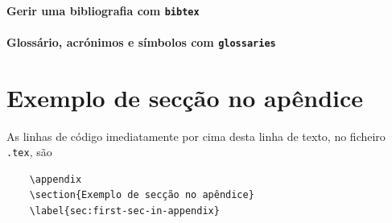 \documentclass[11pt]{article}
\begin{document}
\paragraph{Gerir uma bibliografia com \texttt{bibtex}}

\paragraph{Glossário, acrónimos e símbolos com \texttt{glossaries}}


\appendix

\section{Exemplo de secção no apêndice}
\label{sec:first-sec-in-appendix}

As linhas de código imediatamente por cima desta linha de texto, no ficheiro
\texttt{.tex}, são
\begin{verbatim}
    \appendix
    \section{Exemplo de secção no apêndice}
    \label{sec:first-sec-in-appendix}
\end{verbatim}
\end{document}
